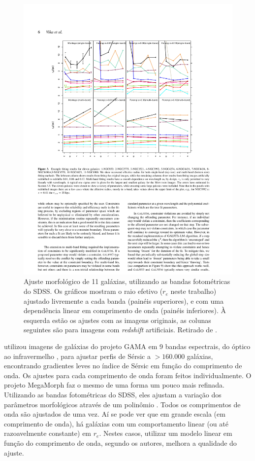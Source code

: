 \begin{figure}
	\includegraphics{figuras/vika-properties}
	\caption[Ajuste morfológico de bandas fotométricas] {Ajuste
	morfológico de 11 galáxias, utilizando as bandas fotométricas do
	SDSS. Os gráficos mostram o raio efetivo ($r_e$ neste trabalho) ajustado
	livremente a cada banda (painéis superiores), e com uma dependência linear em
	comprimento de onda (painéis inferiores). À esquerda estão os ajustes com as
	imagens originais, as colunas seguintes são para imagens com {\em redshift}
	artificiais. Retirado de \citet{Vika2013}.}
	\label{fig:propertiesVika}
\end{figure}

\citet{Kelvin2012} utilizou imagens de galáxias do projeto GAMA
\citep{Driver2009} em 9 bandas espectrais, do óptico \citep[bandas $ugriz$ do
DR7]{Abazajian2009} ao infravermelho \citep[bandas $YJHK$ do
UKIDSS]{Lawrence2007}, para ajustar perfis de Sérsic a $>\!160.000$ galáxias,
encontrando gradientes leves no índice de Sérsic em função do comprimento de
onda. Os ajustes para cada comprimento de onda foram feitos individualmente. O
projeto MegaMorph \citep{Haussler2013} faz o mesmo de uma forma um pouco mais
refinada. Utilizando as bandas fotométricas do SDSS, eles ajustam a variação dos
parâmetros morfológicos através de um polinômio \citep[Figura
\ref{fig:propertiesVika}]{Vika2013}. Todos os comprimentos de onda são ajustados
de uma vez. Aí se pode ver que em grande escala (em comprimento de onda), há
galáxias com um comportamento linear (ou até razoavelmente constante) em $r_e$.
Nestes casos, utilizar um modelo linear em função do comprimento de onda,
segundo os autores, melhora a qualidade do ajuste.

